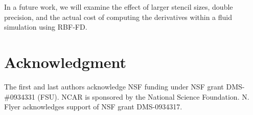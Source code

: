 \documentclass[10pt,conference,compsocconf]{IEEEtran}
\begin{document}
In a future work, we will examine the effect of larger stencil sizes,
double precision, and the actual cost of computing the derivatives
within a fluid simulation using RBF-FD.

\section*{Acknowledgment}
The first and last authors acknowledge NSF funding under NSF grant DMS-\#0934331 (FSU). 
NCAR is sponsored by the National Science Foundation. N. Flyer      
acknowledges support of NSF grant DMS-0934317.



\end{document}
